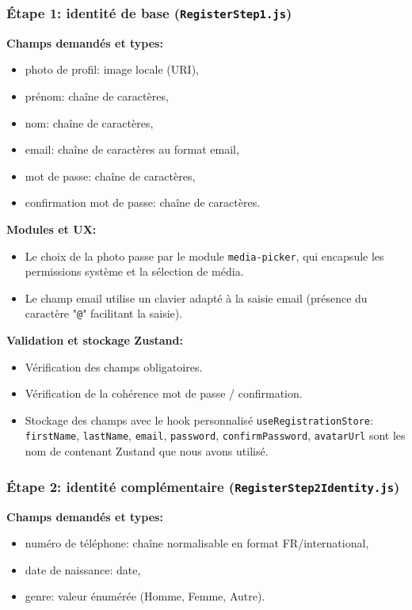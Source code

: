 \subsubsection{Étape 1: identité de base (\texttt{RegisterStep1.js})}

\textbf{Champs demandés et types:}
\begin{itemize}
    \item photo de profil: image locale (URI),
    \item prénom: chaîne de caractères,
    \item nom: chaîne de caractères,
    \item email: chaîne de caractères au format email,
    \item mot de passe: chaîne de caractères,
    \item confirmation mot de passe: chaîne de caractères.
\end{itemize}

\textbf{Modules et UX:}
\begin{itemize}
    \item Le choix de la photo passe par le module \texttt{media-picker}, qui encapsule les permissions système et la sélection de média.
    \item Le champ email utilise un clavier adapté à la saisie email (présence du caractère "\texttt{@}" facilitant la saisie).
\end{itemize}

\textbf{Validation et stockage Zustand:}
\begin{itemize}
    \item Vérification des champs obligatoires.
    \item Vérification de la cohérence mot de passe / confirmation.
    \item Stockage des champs avec le hook personnalisé \texttt{useRegistrationStore}: \texttt{firstName}, \texttt{lastName}, \texttt{email}, \texttt{password}, \texttt{confirmPassword}, \texttt{avatarUrl} sont les nom de contenant Zustand que nous avons utilisé.
\end{itemize}

\subsubsection{Étape 2: identité complémentaire (\texttt{RegisterStep2Identity.js})}

\textbf{Champs demandés et types:}
\begin{itemize}
    \item numéro de téléphone: chaîne normalisable en format FR/international,
    \item date de naissance: date,
    \item genre: valeur énumérée (Homme, Femme, Autre).
\end{itemize}

